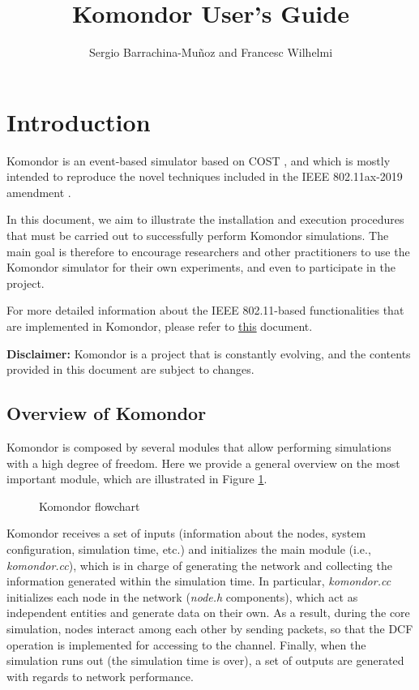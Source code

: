 \documentclass[a4paper]{article}
\title{Komondor User's Guide}
\author{Sergio Barrachina-Mu\~noz and Francesc Wilhelmi}
\begin{document}
\maketitle

\tableofcontents

\listoffigures

\listoftables

\section{Introduction}
\label{section:introduction}

	Komondor \cite{barrachina2017komondor} is an event-based simulator based on COST \cite{chen2002reusing}, and which is mostly intended to reproduce the novel techniques included in the IEEE 802.11ax-2019 amendment \cite{tgax2017draft}.
	
	In this document, we aim to illustrate the installation and execution procedures that must be carried out to successfully perform Komondor simulations. The main goal is therefore to encourage researchers and other practitioners to use the Komondor simulator for their own experiments, and even to participate in the project.	
	
	For more detailed information about the IEEE 802.11-based functionalities that are implemented in Komondor, please refer to \href{https://github.com/wn-upf/Komondor/blob/master/Documentation/Tutorial/LaTeX\%20files/komondor_technical_report.pdf}{this} document.
	
	\textbf{Disclaimer:} Komondor is a project that is constantly evolving, and the contents provided in this document are subject to changes.
	
	\subsection{Overview of Komondor}
	\label{section:flowchart}
	Komondor is composed by several modules that allow performing simulations with a high degree of freedom. Here we provide a general overview on the most important module, which are illustrated in Figure \ref{fig:komondor_flowchart}.
	\begin{figure}[h!]
		\centering
		\caption{Komondor flowchart}
		\label{fig:komondor_flowchart}
	\end{figure}		
	
	Komondor receives a set of inputs (information about the nodes, system configuration, simulation time, etc.) and initializes the main module (i.e., \textit{komondor.cc}), which is in charge of generating the network and collecting the information generated within the simulation time. In particular, \textit{komondor.cc} initializes each node in the network (\textit{node.h} components), which act as independent entities and generate data on their own. As a result, during the core simulation, nodes interact among each other by sending packets, so that the DCF operation is implemented for accessing to the channel. Finally, when the simulation runs out (the simulation time is over), a set of outputs are generated with regards to network performance.
	
\end{document}
